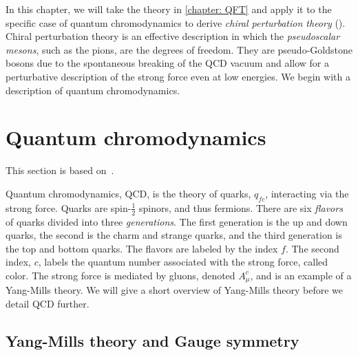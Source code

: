 In this chapter, we will take the theory in \autoref{chapter: QFT} and apply it to the specific case of quantum chromodynamics to derive \emph{chiral perturbation theory} (\chpt).
Chiral perturbation theory is an effective description in which the \emph{pseudoscalar mesons}, such as the pions, are the degrees of freedom.
They are pseudo-Goldstone bosons due to the spontaneous breaking of the QCD vacuum and allow for a perturbative description of the strong force even at low energies.
We begin with a description of quantum chromodynamics.


\section{Quantum chromodynamics}
\label{section:qcd}

This section is based on~\autocite{peskinIntroductionQuantumField1995,schererIntroductionChiralPerturbation2002,schwartzQuantumFieldTheory2013}.

Quantum chromodynamics, QCD, is the theory of quarks, $q_{fc}$, interacting via the strong force.
Quarks are spin-$\frac{1}{2}$ spinors, and thus fermions.
There are six \emph{flavors} of quarks divided into three \emph{generations}.
The first generation is the up and down quarks, the second is the charm and strange quarks, and the third generation is the top and bottom quarks.
The flavors are labeled by the index $f$.
The second index, $c$, labels the quantum number associated with the strong force, called color.
The strong force is mediated by gluons, denoted $A_\mu^c$, and is an example of a Yang-Mills theory.
We will give a short overview of Yang-Mills theory before we detail QCD further.


\subsection{Yang-Mills theory and Gauge symmetry}
\label{subsection: yang-mills theory and gauge symmetry}


